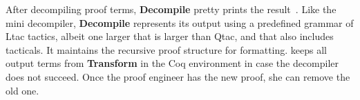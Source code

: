 After decompiling proof terms, \textbf{Decompile} pretty prints the result~\href{https://github.com/uwplse/pumpkin-pi/blob/silent/plugin/src/coq-plugin-lib/src/coq/decompiler/decompiler.ml}{}.
Like the mini decompiler, \textbf{Decompile} represents its output using a predefined grammar of Ltac tactics,
albeit one larger that is larger than Qtac, and that also includes tacticals.
It maintains the recursive proof structure for formatting. %
\toolname keeps all output terms from \textbf{Transform} in the Coq environment in case the decompiler does not succeed.
Once the proof engineer has the new proof, she can remove the old one.


